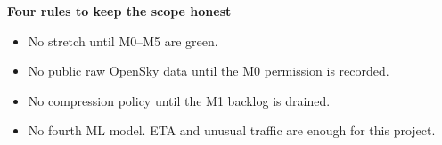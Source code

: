 \documentclass[10.5pt]{article}
\begin{document}
\vspace{4pt}
\begin{softcard}
{\bfseries Four rules to keep the scope honest}
\begin{itemize}[leftmargin=1.1em,itemsep=2pt,topsep=2pt]
  \item No stretch until M0--M5 are green.
  \item No public raw OpenSky data until the M0 permission is recorded.
  \item No compression policy until the M1 backlog is drained.
  \item No fourth ML model. ETA and unusual traffic are enough for this project.
\end{itemize}
\end{softcard}

\newpage
{}
\end{document}
